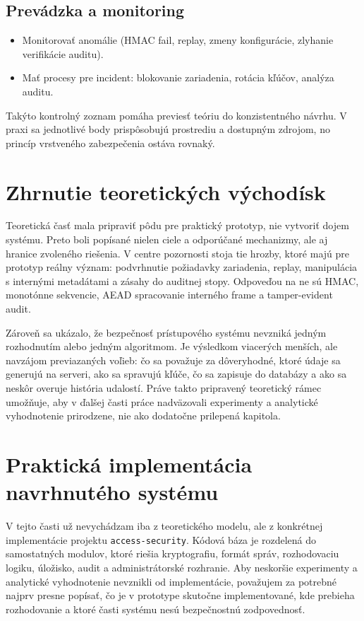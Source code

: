 \documentclass[journal,a4paper,onecolumn]{IEEEtran}
\begin{document}
\subsection{Prevádzka a monitoring}

\begin{itemize}[leftmargin=*,itemsep=2pt]
  \item Monitorovať anomálie (HMAC fail, replay, zmeny konfigurácie, zlyhanie verifikácie auditu).
  \item Mať procesy pre incident: blokovanie zariadenia, rotácia kľúčov, analýza auditu.
\end{itemize}

Takýto kontrolný zoznam pomáha previesť teóriu do konzistentného návrhu. V praxi sa jednotlivé body prispôsobujú prostrediu a dostupným zdrojom, no princíp vrstveného zabezpečenia ostáva rovnaký.

\section{Zhrnutie teoretických východísk}

Teoretická časť mala pripraviť pôdu pre praktický prototyp, nie vytvoriť dojem  systému. Preto boli popísané nielen ciele a odporúčané mechanizmy, ale aj hranice zvoleného riešenia. V centre pozornosti stoja tie hrozby, ktoré majú pre prototyp reálny význam: podvrhnutie požiadavky zariadenia, replay, manipulácia s internými metadátami a zásahy do auditnej stopy. Odpoveďou na ne sú HMAC, monotónne sekvencie, AEAD spracovanie interného frame a tamper-evident audit.

Zároveň sa ukázalo, že bezpečnosť prístupového systému nevzniká jedným rozhodnutím alebo jedným algoritmom. Je výsledkom viacerých menších, ale navzájom previazaných voľieb: čo sa považuje za dôveryhodné, ktoré údaje sa generujú na serveri, ako sa spravujú kľúče, čo sa zapisuje do databázy a ako sa neskôr overuje história udalostí. Práve takto pripravený teoretický rámec umožňuje, aby v ďalšej časti práce nadväzovali experimenty a analytické vyhodnotenie prirodzene, nie ako dodatočne prilepená kapitola.




\section{Praktická implementácia navrhnutého systému}

V tejto časti už nevychádzam iba z teoretického modelu, ale z konkrétnej implementácie projektu \texttt{access-security}. Kódová báza je rozdelená do samostatných modulov, ktoré riešia kryptografiu, formát správ, rozhodovaciu logiku, úložisko, audit a administrátorské rozhranie. Aby neskoršie experimenty a analytické vyhodnotenie nevznikli  od implementácie, považujem za potrebné najprv presne popísať, čo je v prototype skutočne implementované, kde prebieha rozhodovanie a ktoré časti systému nesú bezpečnostnú zodpovednosť.
\end{document}
